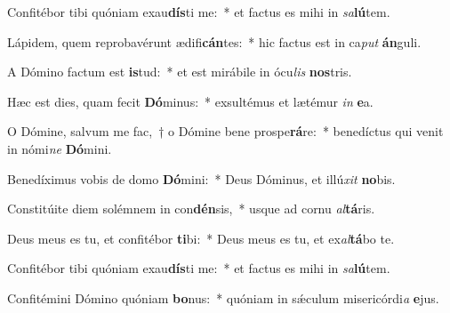 \item Confitébor tibi quóniam exau\textbf{dís}ti me:~* et factus es mihi in \textit{sa}\textbf{lú}tem.
\item Lápidem, quem reprobavérunt ædifi\textbf{cán}tes:~* hic factus est in ca\textit{put} \textbf{án}guli.
\item A Dómino factum est \textbf{is}tud:~* et est mirábile in ócu\textit{lis} \textbf{nos}tris.
\item Hæc est dies, quam fecit \textbf{Dó}minus:~* exsultémus et lætémur \textit{in} \textbf{e}a.
\item O Dómine, salvum me fac,~† o Dómine bene prospe\textbf{rá}re:~* benedíctus qui venit in nómi\textit{ne} \textbf{Dó}mini.
\item Benedíximus vobis de domo \textbf{Dó}mini:~* Deus Dóminus, et illú\textit{xit} \textbf{no}bis.
\item Constitúite diem solémnem in con\textbf{dén}sis,~* usque ad cornu \textit{al}\textbf{tá}ris.
\item Deus meus es tu, et confitébor \textbf{ti}bi:~* Deus meus es tu, et ex\textit{al}\textbf{tá}bo te.
\item Confitébor tibi quóniam exau\textbf{dís}ti me:~* et factus es mihi in \textit{sa}\textbf{lú}tem.
\item Confitémini Dómino quóniam \textbf{bo}nus:~* quóniam in sǽculum misericórdi\textit{a} \textbf{e}jus.
